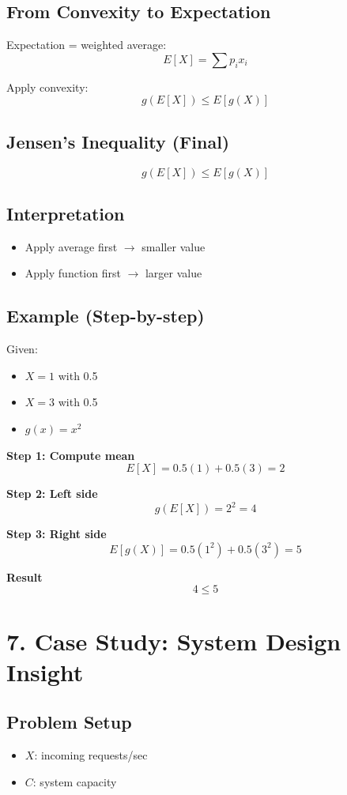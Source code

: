 \documentclass[11pt]{article}
\begin{document}
\subsection*{From Convexity to Expectation}
Expectation = weighted average:
\[
E[X] = \sum p_i x_i
\]

Apply convexity:
\[
g(E[X]) \le E[g(X)]
\]

\subsection*{Jensen’s Inequality (Final)}
\[
g(E[X]) \le E[g(X)]
\]

\subsection*{Interpretation}
\begin{itemize}
\item Apply average first $\rightarrow$ smaller value
\item Apply function first $\rightarrow$ larger value
\end{itemize}

\subsection*{Example (Step-by-step)}

Given:
\begin{itemize}
\item $X = 1$ with 0.5
\item $X = 3$ with 0.5
\item $g(x) = x^2$
\end{itemize}

\textbf{Step 1: Compute mean}
\[
E[X] = 0.5(1) + 0.5(3) = 2
\]

\textbf{Step 2: Left side}
\[
g(E[X]) = 2^2 = 4
\]

\textbf{Step 3: Right side}
\[
E[g(X)] = 0.5(1^2) + 0.5(3^2) = 5
\]

\textbf{Result}
\[
4 \le 5
\]

\section*{7. Case Study: System Design Insight}

\subsection*{Problem Setup}
\begin{itemize}
\item $X$: incoming requests/sec
\item $C$: system capacity
\end{itemize}
\end{document}
